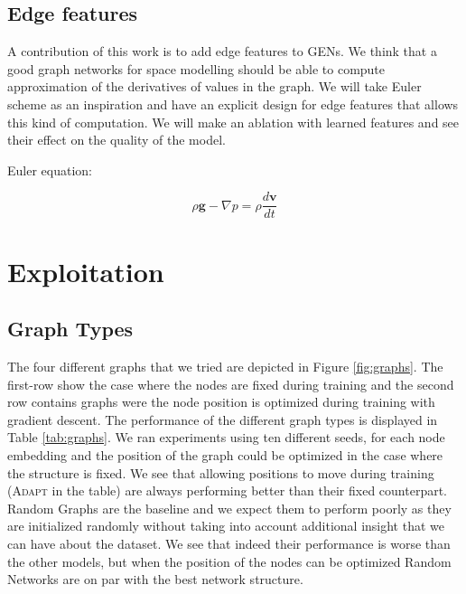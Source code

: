 \documentclass[a4paper,10pt]{article}
\newcommand{\ap}[1]{\marginpar{{\tiny \color{red} [AP] #1}}}
\begin{document}
\subsection{Edge features}
A contribution of this work is to add edge features to GENs. We think that a good graph networks for space modelling should be able to compute approximation of the derivatives of values in the graph. We will take Euler scheme as an inspiration and have an explicit design for edge features that allows this kind of computation. We will make an ablation with learned features and see their effect on the quality of the model.
\ap{TODO: sketch}


Euler equation:

\begin{equation}
  \rho \mathbf{g} - \nabla p = \rho\frac{d\mathbf{v}}{dt}
\end{equation}


\section{Exploitation}

\subsection{Graph Types}

The four different graphs that we tried are depicted in Figure \ref{fig:graphs}. The first-row show the case where the nodes are fixed during training and the second row contains graphs were the node position is optimized during training with gradient descent.
The performance of the different graph types is displayed in Table \ref{tab:graphs}. We ran experiments using ten different seeds, for each node embedding and the position of the graph could be optimized in the case where the structure is fixed.
We see that allowing positions to move during training (\textsc{Adapt} in the table) are always performing better than their fixed counterpart. Random Graphs are the baseline and we expect them to perform poorly as they are initialized randomly without taking into account additional insight that we can have about the dataset. We see that indeed their performance is worse than the other models, but when the position of the nodes can be optimized Random Networks are on par with the best network structure.
\end{document}
